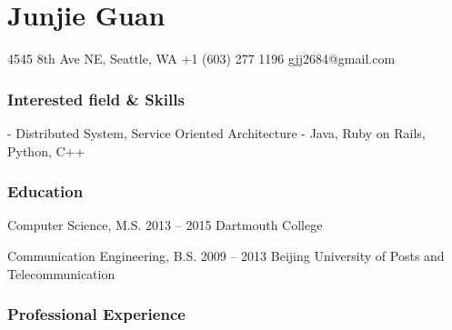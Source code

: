 \documentclass{tccv}
\begin{document}
\part{Junjie Guan}
	
\begin{multicols}{2}

\personal
    {4545 8th Ave NE, Seattle, WA}
    {+1 (603) 277 1196}
    {gjj2684@gmail.com}

\section{Interested field \& Skills}
- Distributed System, Service Oriented Architecture	
- Java, Ruby on Rails, Python, C++



\section{Education}

\begin{yearlist}

\item[Computer Science, M.S.]{2013 -- 2015}
     {Dartmouth College}

\item[Communication Engineering, B.S.]{2009 -- 2013}
     {Beijing University of Posts and Telecommunication}

\end{yearlist}






\end{multicols}















\section{Professional Experience}
\end{document}
